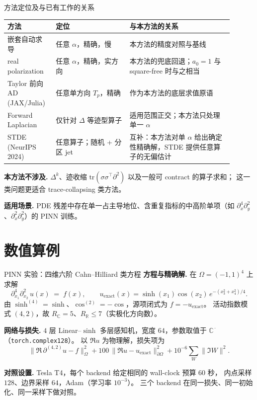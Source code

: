 \documentclass[10pt,aspectratio=169]{beamer}
\newcommand{\R}{\mathbb{R}}
\newcommand{\C}{\mathbb{C}}
\newcommand{\Tp}{T_p}
\begin{document}
\begin{frame}{方法定位及与已有工作的关系}
  \begin{tabular}{p{0.18\linewidth}p{0.30\linewidth}p{0.42\linewidth}}
    \toprule
    \textbf{方法} & \textbf{定位} & \textbf{与本方法的关系} \\
    \midrule
    嵌套自动求导 & 任意 $\alpha$，精确，慢 & 本方法的精度对照与基线 \\[2pt]
    real polarization & 任意 $\alpha$，精确，实方向 & 本方法的兜底回退；$a_0=1$ 与 square-free 时与之相当 \\[2pt]
    Taylor 前向 AD\,(JAX/Julia) & 任意单方向 $\Tp$，精确 & 作为本方法的底层求值原语 \\[2pt]
    Forward Laplacian & 仅针对 $\Delta$ 等迹型算子 & 适用范围正交；本方法只处理单一 $\alpha$ \\[2pt]
    STDE\,(NeurIPS 2024) & 任意算子；随机 + 分区 jet & 互补：本方法对单 $\alpha$ 给出确定性精确解，STDE 提供任意算子的无偏估计 \\
    \bottomrule
  \end{tabular}

  \medskip
  \textbf{本方法不涉及.}\;
  $\Delta^k$、迹收缩 $\mathrm{tr}(\sigma\sigma^{\top}\partial^2)$ 以及一般可 contract 的算子求和；
  这一类问题更适合 trace-collapsing 类方法。

  \medskip
  \textbf{适用场景.}\;
  PDE 残差中存在单一占主导地位、含重复指标的中高阶单项（如 $\partial_x^4\partial_y^2$、$\partial_x^2\partial_y^2$）的 PINN 训练。
\end{frame}

\section{数值算例}

\begin{frame}{PINN 实验：四维六阶 Cahn--Hilliard 类方程}
  \textbf{方程与精确解.}\;
  在 $\Omega=(-1,1)^4$ 上求解
  \[
    \partial_{x_1}^{4}\partial_{x_2}^{2}\,u(x) \;=\; f(x),
    \qquad
    u_{\mathrm{exact}}(x)=\sinh(x_1)\cos(x_2)\,e^{-(x_3^2+x_4^2)/4}.
  \]
  由 $\sinh^{(4)}=\sinh$、$\cos^{(2)}=-\cos$，源项闭式为 $f=-u_{\mathrm{exact}}$。
  活动指数模式 $(4,2)$，故 $R_\C=5$、$R_\R\le 7$（实极化方向数）。

  \medskip
  \textbf{网络与损失.}\;
  $4$ 层 Linear--$\sinh$ 多层感知机，宽度 $64$，参数取值于 $\C^{\,\cdot}$（\texttt{torch.complex128}）。
  以 $\Re u$ 为物理解，损失项为
  \[
    \|\Re\,\partial^{(4,2)} u - f\|_{\Omega}^{2}
    + 100\,\|\Re u - u_{\mathrm{exact}}\|_{\partial\Omega}^{2}
    + 10^{-6}\sum_{W}\|\Im W\|^{2}.
  \]

  \medskip
  \textbf{对照设置.}\;
  Tesla T4，每个 backend 给定相同的 wall-clock 预算 $60$ 秒，
  内点采样 $128$、边界采样 $64$，Adam（学习率 $10^{-3}$）。
  三个 backend 在同一损失、同一初始化、同一采样下做对照。
\end{frame}
\end{document}

